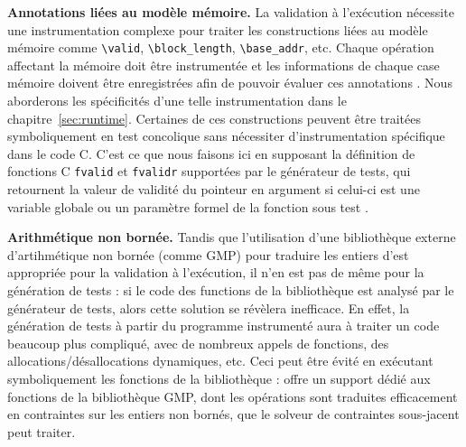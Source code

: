 
\textbf{Annotations liées au modèle mémoire.}
La validation à l'exécution nécessite une instrumentation complexe pour traiter
les constructions \eacsl liées au modèle mémoire comme \lstinline'\valid',
\lstinline'\block_length', \lstinline'\base_addr', etc.
Chaque opération affectant la mémoire doit être instrumentée et les informations
de chaque case mémoire doivent être enregistrées afin de pouvoir évaluer ces
annotations \cite{Kosmatov/RV13}.
Nous aborderons les spécificités d'une telle instrumentation dans le
chapitre~\ref{sec:runtime}.
Certaines de ces constructions peuvent être traitées symboliquement en test
concolique sans nécessiter d'instrumentation spécifique dans le code C.
C'est ce que nous faisons ici en supposant la définition de fonctions C
\lstinline'fvalid' et \lstinline'fvalidr' supportées par le générateur de tests,
qui retournent la valeur de validité du pointeur en argument si celui-ci est
une variable globale ou un paramètre formel de la fonction sous test
\cite{Chebaro/ICSSEA12}.

\textbf{Arithmétique non bornée.}
Tandis que l'utilisation d'une bibliothèque externe d'artihmétique non bornée
(comme GMP) pour traduire les entiers d'\eacsl est appropriée pour la validation
à l'exécution, il n'en est pas de même pour la génération de tests :
si le code des functions de la bibliothèque est analysé par le
générateur de tests, alors cette solution se révèlera inefficace.
En effet, la génération de tests à partir du programme instrumenté aura à
traiter un code beaucoup plus compliqué, avec de nombreux appels de fonctions, 
des allocations/désallocations dynamiques, etc.
Ceci peut être évité en exécutant symboliquement les fonctions de la
bibliothèque : \pathcrawler offre un support dédié aux fonctions de la
bibliothèque GMP, dont les opérations sont traduites efficacement en contraintes
sur les entiers non bornés, que le solveur de contraintes sous-jacent peut
traiter.

